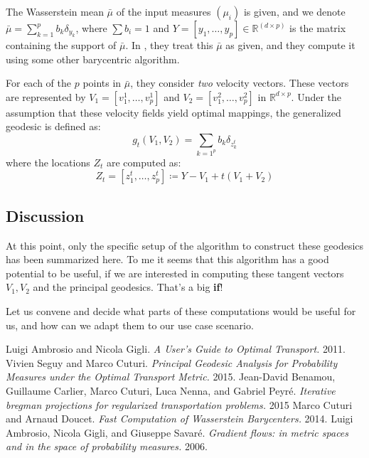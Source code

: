 \documentclass{article}
\begin{document}
The Wasserstein mean $\bar\mu$ of the input measures $(\mu_i)$ is given,
and we denote $\bar\mu = \sum_{k=1}^pb_k\delta_{y_k}$, where $\sum b_i=1$
and $Y=[y_1,\dots, y_p]\in \mathbb{R}^(d\times p)$ is the matrix containing
the support of $\bar\mu$. In \cite{seguycuturi2015}, they treat this $\bar\mu$
as given, and they compute it using some other barycentric algorithm.

For each of the $p$ points in $\bar\mu$, they consider \textit{two} velocity 
vectors. These vectors are represented by $V_1=[v_1^1,\dots,v_p^1]$ and  
$V_2=[v_1^2,\dots,v_p^2]$ in $\mathbb{R}^{d\times p}$. Under the assumption
that these velocity fields yield optimal mappings, the generalized geodesic
is defined as:
\[g_t(V_1, V_2) = \sum_{k=1^p}b_k\delta_{z^t_k} \]
where the locations $Z_t$ are computed as:
\[ Z_t = [z_1^t,\dots,z_p^t] \coloneqq Y-V_1 + t(V_1+V_2)\]


\subsection{Discussion}

At this point, only the specific setup of the algorithm to construct these
geodesics has been summarized here. To me it seems that this algorithm has
a good potential to be useful, if we are interested in computing these tangent 
vectors $V_1, V_2$ and the principal geodesics. That's a big \textbf{if}!

Let us convene and decide what parts of
these computations would be useful for us, and how can we adapt them to our use
case scenario.

\begin{thebibliography}{1}
     Luigi Ambrosio and Nicola Gigli. {\em A User's Guide to Optimal Transport.} 2011.
     Vivien Seguy and Marco Cuturi. {\em Principal Geodesic Analysis for Probability Measures under the Optimal Transport Metric.} 2015.
     Jean-David Benamou, Guillaume Carlier, Marco Cuturi, Luca Nenna, and Gabriel Peyré. {\em Iterative bregman projections for regularized transportation problems.} 2015
     Marco Cuturi and Arnaud Doucet. {\em Fast Computation of Wasserstein Barycenters.} 2014.
     Luigi Ambrosio, Nicola Gigli, and Giuseppe Savaré. {\em Gradient flows: in metric spaces and in the space of probability measures.} 2006.
\end{thebibliography}
\end{document}
